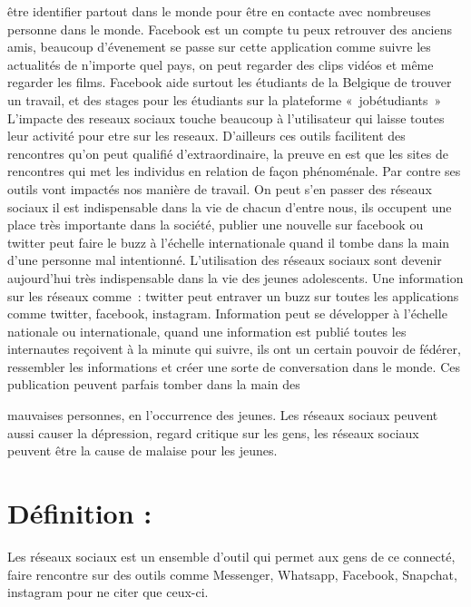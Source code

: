 \documentclass[12pt,a4paper,titlepage]{article}
\begin{document}
être identifier partout dans le monde pour être en contacte
avec nombreuses personne dans le monde. Facebook est un
compte tu peux retrouver des anciens amis, beaucoup
d’évenement se passe sur cette application comme suivre les
actualités de n’importe quel pays, on peut regarder des clips
vidéos et même regarder les films. Facebook aide surtout les
étudiants de la Belgique de trouver un travail, et des stages
pour les étudiants sur la plateforme « jobétudiants »
L’impacte des reseaux sociaux touche beaucoup à l’utilisateur
qui laisse toutes leur activité pour etre sur les reseaux.
D’ailleurs ces outils facilitent des rencontres qu’on peut
qualifié d’extraordinaire, la preuve en est que les sites de
rencontres qui met les individus en relation de façon
phénoménale. Par contre ses outils vont impactés nos
manière de travail. On peut s’en passer des réseaux sociaux il
est indispensable dans la vie de chacun d’entre nous, ils
occupent une place très importante dans la société, publier
une nouvelle sur facebook ou twitter peut faire le buzz à
l’échelle internationale quand il tombe dans la main d’une
personne mal intentionné.
L’utilisation des réseaux sociaux sont devenir aujourd’hui très
indispensable dans la vie des jeunes adolescents. Une
information sur les réseaux comme : twitter peut entraver un
buzz sur toutes les applications comme twitter, facebook,
instagram. Information peut se développer à l’échelle
nationale ou internationale, quand une information est publié
toutes les internautes reçoivent à la minute qui suivre, ils ont
un certain pouvoir de fédérer, ressembler les informations et
créer une sorte de conversation dans le monde. Ces
publication peuvent parfais tomber dans la main des

mauvaises personnes, en l’occurrence des jeunes. Les réseaux
sociaux peuvent aussi causer la dépression, regard critique
sur les gens, les réseaux sociaux peuvent être la cause de
malaise pour les jeunes.

\section{Définition :}
Les réseaux sociaux est un ensemble d’outil qui permet aux
gens de ce connecté, faire rencontre sur des outils comme
Messenger, Whatsapp, Facebook, Snapchat, instagram pour
ne citer que ceux-ci.
\end{document}
